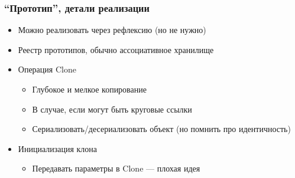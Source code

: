 \documentclass{../../slides-style}
\begin{document}
    \begin{frame}
        \frametitle{``Прототип'', детали реализации}
        \begin{itemize}
            \item Можно реализовать через рефлексию (но не нужно)
            \item Реестр прототипов, обычно ассоциативное хранилище
            \item Операция Clone
            \begin{itemize}
                \item Глубокое и мелкое копирование
                \item В случае, если могут быть круговые ссылки
                \item Сериализовать/десериализовать объект (но помнить про идентичность)
            \end{itemize}
            \item Инициализация клона
            \begin{itemize}
                \item Передавать параметры в Clone --- плохая идея
            \end{itemize}
        \end{itemize}
    \end{frame}
\end{document}
